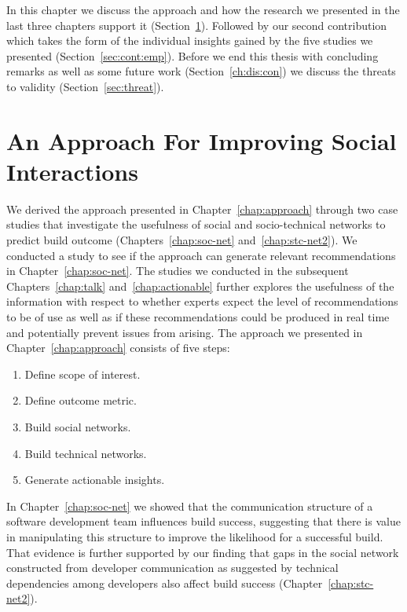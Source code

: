 \label{chap:disc}
In this chapter we discuss the approach and how the research we presented in the last three chapters support it (Section~\ref{ch:dis:app}).
Followed by our second contribution which takes the form of the individual insights gained by the five studies we presented (Section~\ref{sec:cont:emp}).
Before we end this thesis with concluding remarks as well as some future work (Section~\ref{ch:dis:con}) we discuss the threats to validity (Section~\ref{sec:threat}).

\section{An Approach For Improving Social Interactions}
\label{ch:dis:app}
We derived the approach presented in Chapter~\ref{chap:approach} through two case studies that investigate the usefulness of social and socio-technical networks to predict build outcome (Chapters~\ref{chap:soc-net} and~\ref{chap:stc-net2}).
We conducted a study to see if the approach can generate relevant recommendations in Chapter~\ref{chap:soc-net}.
The studies we conducted in the subsequent Chapters~\ref{chap:talk} and~\ref{chap:actionable} further explores the usefulness of the information with respect to whether experts expect the level of recommendations to be of use as well as if these recommendations could be produced in real time and potentially prevent issues from arising.
The approach we presented in Chapter~\ref{chap:approach} consists of five steps:

\begin{enumerate}
\item Define scope of interest.
\item Define outcome metric.
\item Build social networks.
\item Build technical networks.
\item Generate actionable insights.
\end{enumerate}

In Chapter~\ref{chap:soc-net} we showed that the communication structure of a software development team influences build success, suggesting that there is value in manipulating this structure to improve the likelihood for a successful build.
That evidence is further supported by our finding that gaps in the social network constructed from developer communication as suggested by technical dependencies among developers also affect build success (Chapter~\ref{chap:stc-net2}).

